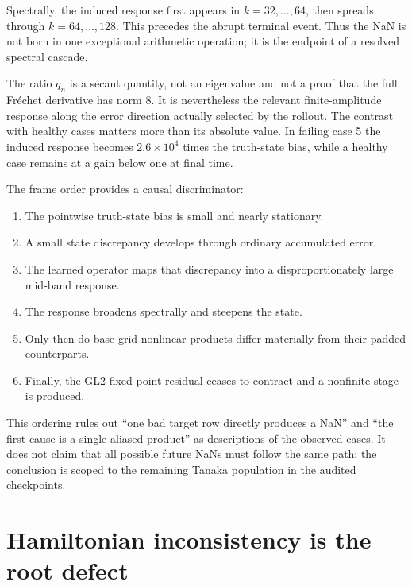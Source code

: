\documentclass[11pt]{article}
\begin{document}
Spectrally, the induced response first appears in \(k=32,\ldots,64\), then
spreads through \(k=64,\ldots,128\).  This precedes the abrupt terminal event.
Thus the NaN is not born in one exceptional arithmetic operation; it is the
endpoint of a resolved spectral cascade.

The ratio \(q_n\) is a secant quantity, not an eigenvalue and not a proof that
the full Fr\'echet derivative has norm 8.  It is nevertheless the relevant
finite-amplitude response along the error direction actually selected by the
rollout.  The contrast with healthy cases matters more than its absolute
value.  In failing case 5 the induced response becomes
\(2.6\times10^4\) times the truth-state bias, while a healthy case remains at a
gain below one at final time.

The frame order provides a causal discriminator:
\begin{enumerate}
  \item The pointwise truth-state bias is small and nearly stationary.
  \item A small state discrepancy develops through ordinary accumulated error.
  \item The learned operator maps that discrepancy into a disproportionately
        large mid-band response.
  \item The response broadens spectrally and steepens the state.
  \item Only then do base-grid nonlinear products differ materially from their
        padded counterparts.
  \item Finally, the GL2 fixed-point residual ceases to contract and a
        nonfinite stage is produced.
\end{enumerate}
This ordering rules out ``one bad target row directly produces a NaN'' and
``the first cause is a single aliased product'' as descriptions of the observed
cases.  It does not claim that all possible future NaNs must follow the same
path; the conclusion is scoped to the remaining Tanaka population in the
audited checkpoints.

\section{Hamiltonian inconsistency is the root defect}
\end{document}
